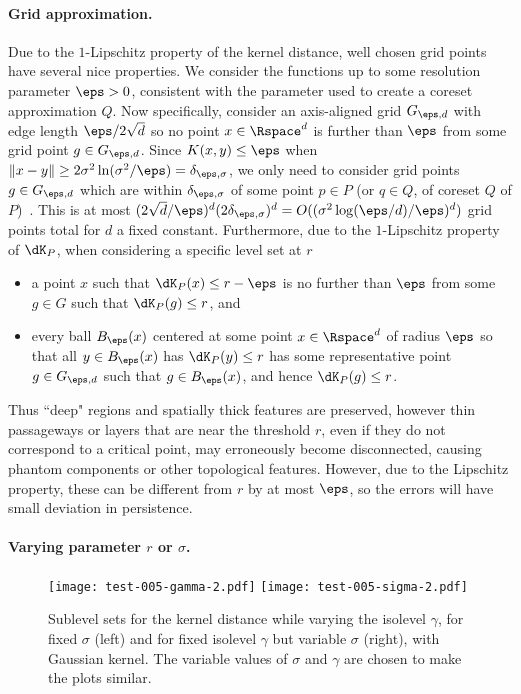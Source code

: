 \documentclass[11pt]{myclass}
\begin{document}
\paragraph{Grid approximation.}
Due to the $1$-Lipschitz property of the kernel distance, well chosen grid points have several nice properties.  
We consider the functions up to some resolution parameter $\eps > 0$, consistent with the parameter used to create a coreset approximation $Q$.  
Now specifically, consider an axis-aligned grid $G_{\eps,d}$ with edge length $\eps/2\sqrt{d}$ so no point $x \in \Rspace^d$ is further than $\eps$ from some grid point $g \in G_{\eps,d}$.  
Since $K(x,y) \leq \eps$ when $\|x-y\| \geq 2 \sigma^2 \ln(\sigma^2/\eps) = \delta_{\eps,\sigma}$, we only need to consider grid points $g \in G_{\eps,d}$ which are within $\delta_{\eps,\sigma}$ of some point $p \in P$ (or $q \in Q$, of coreset $Q$ of $P$)~\cite{JoshiKommarajuPhillips2011,big-kde}.  This is at most $(2\sqrt{d} / \eps)^d (2 \delta_{\eps,\sigma})^d = O((\sigma^2 \log (\eps/d) /\eps)^d)$ grid points total for $d$ a fixed constant.  
Furthermore, due to the $1$-Lipschitz property of $\dK_P$, when considering a specific level set at $r$
\begin{itemize}
\item a point $x$ such that $\dK_P(x) \leq r - \eps$ is no further than $\eps$ from some $g \in G$ such that $\dK_P(g) \leq r$, and 
\item every ball $B_{\eps}(x)$ centered at some point $x \in \Rspace^d$ of radius $\eps$ so that all $y \in B_{\eps}(x)$ has $\dK_P(y) \leq r$ has some representative point $g \in G_{\eps,d}$ such that $g \in B_{\eps}(x)$, and hence $\dK_P(g) \leq r$. 
\end{itemize} 
Thus ``deep" regions and spatially thick features are preserved, however thin passageways or layers that are near the threshold $r$, even if they do not correspond to a critical point, may erroneously become disconnected, causing phantom components or other topological features.  However, due to the Lipschitz property, these can be different from $r$ by at most $\eps$, so the errors will have small deviation in persistence.



\paragraph{Varying parameter $r$ or $\sigma$.}
\label{sec:exp}

\begin{figure}
\begin{center}
\texttt{[image: test-005-gamma-2.pdf]}
\hspace{10mm}
\texttt{[image: test-005-sigma-2.pdf]}
\end{center}

\caption{\label{fig:gamma-v-sigma} \small \sffamily
Sublevel sets for the kernel distance while varying the isolevel $\gamma$, for fixed $\sigma$ (left) and for fixed isolevel $\gamma$ but variable $\sigma$ (right), with Gaussian kernel.  The variable values of $\sigma$ and $\gamma$ are chosen to make the plots similar.}  
\end{figure}
\end{document}

